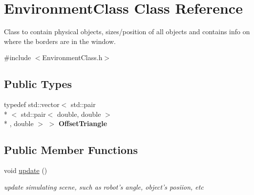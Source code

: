 \hypertarget{classEnvironmentClass}{\section{Environment\-Class Class Reference}
\label{classEnvironmentClass}
}


Class to contain physical objects, sizes/position of all objects and contains info on where the borders are in the window.  




{\ttfamily \#include $<$Environment\-Class.\-h$>$}

\subsection*{Public Types}
\begin{DoxyCompactItemize}
\item 
\hypertarget{classEnvironmentClass_a563d291dc565587df66e61b8bca1cd91}{typedef std\-::vector$<$ std\-::pair\\*
$<$ std\-::pair$<$ double, double $>$\\*
, double $>$ $>$ {\bfseries Offset\-Triangle}}\label{classEnvironmentClass_a563d291dc565587df66e61b8bca1cd91}

\end{DoxyCompactItemize}
\subsection*{Public Member Functions}
\begin{DoxyCompactItemize}
\item 
void \hyperlink{classEnvironmentClass_a2ea61074efd8e3f099e2876a101c219f}{update} ()
\begin{DoxyCompactList}\small\item\em update simulating scene, such as robot's angle, object's posiion, etc \end{DoxyCompactList}\end{DoxyCompactItemize}
